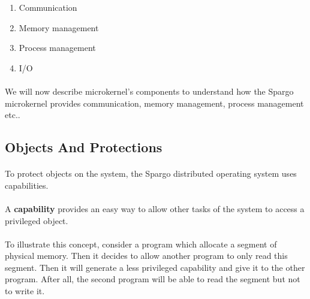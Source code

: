 \documentclass[10pt,a4wide]{article}
\begin{document}
\begin{multicols}{2}
\begin{enumerate}

\item Communication

\item Memory management

\item Process management

\item I/O

\end{enumerate}

\paragraph{}

We will now describe microkernel's components to understand how the Spargo
microkernel provides communication, memory management, process management etc..

\subsection{Objects And Protections}

\paragraph{}

To protect objects on the system, the Spargo distributed operating system uses
capabilities.

\paragraph{}

A \textbf{capability} provides an easy way to allow other tasks of the
system to access a privileged object.

\paragraph{}

To illustrate this concept, consider a program which allocate a segment of
physical memory. Then it decides to allow another program to only read
this segment. Then it will generate a less privileged capability and give
it to the other program. After all, the second program will be able to read
the segment but not to write it.

\paragraph{}


\end{multicols}
\end{document}
